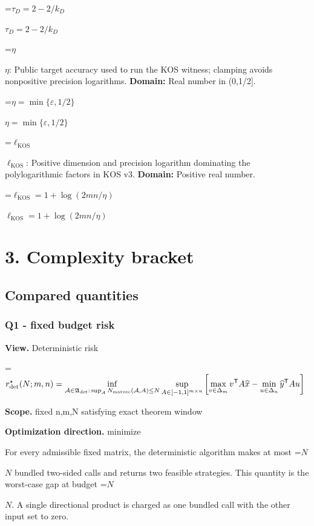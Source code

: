 \documentclass[10pt,a4paper]{article}
\newcommand{\AtlasMath}[1]{\par\begingroup\centering\setbox0=\hbox{$\displaystyle #1$}\ifdim\wd0>1.4\linewidth\typeout{ATLAS WIDE FORMULA: \the\wd0}\fi\ifdim\wd0>\linewidth\resizebox{\linewidth}{!}{\box0}\else\box0\fi\par\endgroup}
\newcommand{\AtlasInlineMath}[1]{\begingroup\setbox0=\hbox{$#1$}\ifdim\wd0>.4\linewidth\endgroup\AtlasMath{#1}\else\endgroup$#1$\fi}
\begin{document}
\AtlasInlineMath{\tau_D=2-2/k_D}



\AtlasInlineMath{\eta}: Public target accuracy used to run the KOS witness; clamping avoids nonpositive precision logarithms. \textbf{Domain:} Real number in (0,1/2].



\AtlasInlineMath{\eta=\min\{\varepsilon,1/2\}}



\AtlasInlineMath{\ell_{\mathrm{KOS}}}: Positive dimension and precision logarithm dominating the polylogarithmic factors in KOS v3. \textbf{Domain:} Positive real number.



\AtlasInlineMath{\ell_{\mathrm{KOS}}=1+\log(2mn/\eta)}



\section{3. Complexity bracket}


\subsection{Compared quantities}


\subsubsection{Q1 - fixed budget risk}


\textbf{View.} Deterministic risk



\AtlasMath{r_{\rm det}^{\star}(N;m,n)=\inf_{\mathcal A\in\mathfrak A_{\rm det}:\,\sup_A N_{\rm matvec}(\mathcal A,A)\le N}\sup_{A\in[-1,1]^{m\times n}}\left[\max_{v\in\Delta_m}v^{\mathsf T}A\widehat x-\min_{u\in\Delta_n}\widehat y^{\mathsf T}Au\right]}


\textbf{Scope.} fixed n,m,N satisfying exact theorem window



\textbf{Optimization direction.} minimize



For every admissible fixed matrix, the deterministic algorithm makes at most \AtlasInlineMath{N} bundled two-sided calls and returns two feasible strategies. This quantity is the worst-case gap at budget \AtlasInlineMath{N}. A single directional product is charged as one bundled call with the other input set to zero.
\end{document}
